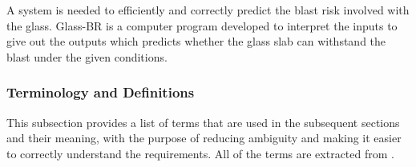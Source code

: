 \documentclass[12pt]{article}
\newcommand{\progname}{Glass-BR}
\begin{document}
A system is needed to efficiently and correctly predict the blast risk involved
with the glass. \progname{} is a computer program developed to interpret the
inputs to give out the outputs which predicts whether the glass slab can
withstand the blast under the given conditions.


\subsubsection{Terminology and  Definitions}

This subsection provides a list of terms that are used in the subsequent
sections and their meaning, with the purpose of reducing ambiguity and making it
easier to correctly understand the requirements.  All of the terms are extracted
from \cite{E1300}.
\end{document}
